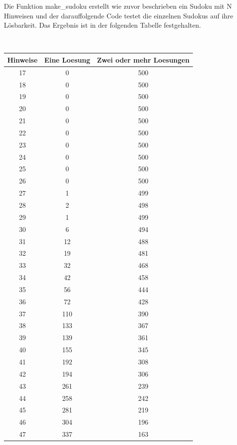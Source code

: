 \documentclass[11pt,a4paper]{article}
\begin{document}
Die Funktion make\_sudoku erstellt wie zuvor beschrieben ein Sudoku mit N Hinweisen und der darauffolgende Code testet die einzelnen Sudokus auf ihre Lösbarkeit. Das Ergebnis ist in der folgenden Tabelle festgehalten.
\newpage

\ \\
\begin{table}[htbp!]
\scriptsize
\begin{center}
\begin{tabular}[htbp!]{|*{3}{c|}}
\hline 
Hinweise & Eine Loesung & Zwei oder mehr Loesungen\\ \hline 
17 & 0 & 500 \\ \hline 
 18 & 0 & 500 \\ \hline 
 19 & 0 & 500 \\ \hline 
 20 & 0 & 500 \\ \hline 
 21 & 0 & 500 \\ \hline 
 22 & 0 & 500 \\ \hline 
 23 & 0 & 500 \\ \hline 
 24 & 0 & 500 \\ \hline 
 25 & 0 & 500 \\ \hline 
 26 & 0 & 500 \\ \hline 
 27 & 1 & 499 \\ \hline 
 28 & 2 & 498 \\ \hline 
 29 & 1 & 499 \\ \hline 
 30 & 6 & 494 \\ \hline 
 31 & 12 & 488 \\ \hline 
 32 & 19 & 481 \\ \hline 
 33 & 32 & 468 \\ \hline 
 34 & 42 & 458 \\ \hline 
 35 & 56 & 444 \\ \hline 
 36 & 72 & 428 \\ \hline 
 37 & 110 & 390 \\ \hline 
 38 & 133 & 367 \\ \hline 
 39 & 139 & 361 \\ \hline 
 40 & 155 & 345 \\ \hline 
 41 & 192 & 308 \\ \hline 
 42 & 194 & 306 \\ \hline 
 43 & 261 & 239 \\ \hline 
 44 & 258 & 242 \\ \hline 
 45 & 281 & 219 \\ \hline 
 46 & 304 & 196 \\ \hline 
 47 & 337 & 163 \\ \hline 

\end{tabular}
\end{center}
\end{table}
\end{document}
